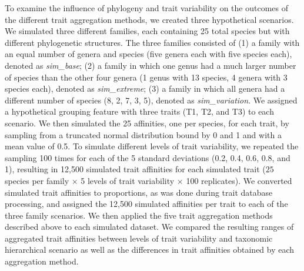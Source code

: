 \documentclass[12pt]{article}
\begin{document}
To examine the influence of phylogeny and trait variability on the outcomes of the different trait aggregation methods, we created three hypothetical scenarios. We simulated three different families, each containing 25 total species but with different phylogenetic structures. The three families consisted of (1) a family with an equal number of genera and species (five genera each with five species each), denoted as \textit{sim\_base}; (2) a family in which one genus had a much larger number of species than the other four genera (1 genus with 13 species, 4 genera with 3 species each), denoted as \textit{sim\_extreme}; (3) a family in which all genera had a different number of species (8, 2, 7, 3, 5), denoted as \textit{sim\_variation}. We assigned a hypothetical grouping feature with three traits (T1, T2, and T3) to each scenario. We then simulated the 25 affinities, one per species, for each trait, by sampling from a truncated normal distribution bound by 0 and 1 and with a mean value of 0.5. To simulate different levels of trait variability, we repeated the sampling 100 times for each of the 5 standard deviations (0.2, 0.4, 0.6, 0.8, and 1), resulting in 12,500 simulated trait affinities for each simulated trait ($25$ species per family $\times$ 5 levels of trait variability $\times$ 100 replicates). We converted simulated trait affinities to proportions, as was done during trait database processing, and assigned the 12,500 simulated affinities per trait to each of the three family scenarios. We then applied the five trait aggregation methods described above to each simulated dataset. We compared the resulting ranges of aggregated trait affinities between levels of trait variability and taxonomic hierarchical scenario as well as the differences in trait affinities obtained by each aggregation method.

\begin{figure}
  \centering
  
  \label{fig:data_proc_overview}
\end{figure}
\newpage
\begin{center}
\label{fig:data_proc_overview}
\end{center}
\end{document}
